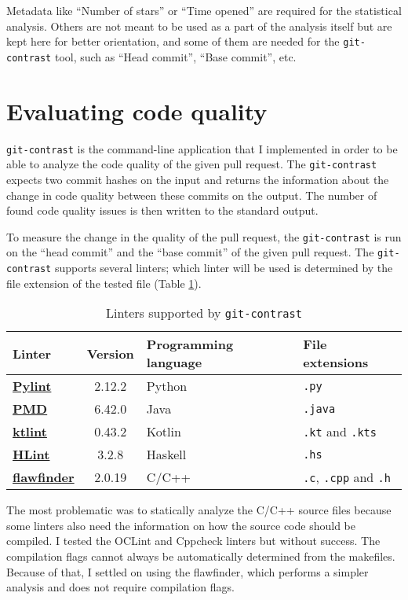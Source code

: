 \documentclass[digital,oneside,oldtable,nolof,nolot,nocover]{fithesis4}
\begin{document}
Metadata like ``Number of stars'' or ``Time opened'' are required for the
statistical analysis.  Others are not meant to be used as a part of the
analysis itself but are kept here for better orientation, and some of them
are needed for the \texttt{git-contrast} tool, such as ``Head commit'', ``Base commit'', etc.
\FloatBarrier
\section{Evaluating code quality}
\label{sec:org28f765a}
\texttt{git-contrast} is the command-line application that I implemented in order to
be able to analyze the code quality of the given pull request. The \texttt{git-contrast}
expects two commit hashes on the input and returns the information about the
change in code quality between these commits on the output.
The number of found code quality issues is
then written to the standard output.

To measure the change in the quality of the pull request, the
\texttt{git-contrast} is run on the ``head commit'' and the ``base commit'' of the given
pull request. The \texttt{git-contrast} supports several linters; which linter will be
used is determined by the file extension of the tested file (Table \ref{tab:org8092335}).
\begin{table}[htbp]
\caption{\label{tab:org8092335}Linters supported by \texttt{git-contrast}}
\centering
\scriptsize
\begin{tabular}{|lcll|}
\hline
Linter & Version & Programming language & File extensions\\
\hline
\hline
\href{https://pylint.pycqa.org/}{\textbf{Pylint}} & 2.12.2 & Python & \texttt{.py}\\
\href{https://pmd.github.io/}{\textbf{PMD}} & 6.42.0 & Java & \texttt{.java}\\
\href{https://ktlint.github.io/}{\textbf{ktlint}} & 0.43.2 & Kotlin & \texttt{.kt} and \texttt{.kts}\\
\href{https://github.com/ndmitchell/hlint}{\textbf{HLint}} & 3.2.8 & Haskell & \texttt{.hs}\\
\href{https://dwheeler.com/flawfinder/}{\textbf{flawfinder}} & 2.0.19 & C/C++ & \texttt{.c}, \texttt{.cpp} and \texttt{.h}\\
\hline
\end{tabular}
\end{table}

The most problematic was to statically analyze the C/C++ source files because
some linters also need the information on how the source code should be
compiled. I tested the OCLint and Cppcheck linters but without success.
The compilation flags cannot always be automatically determined from the makefiles.
Because of that, I settled on using the flawfinder, which performs a simpler analysis and
does not require compilation flags.
\end{document}
